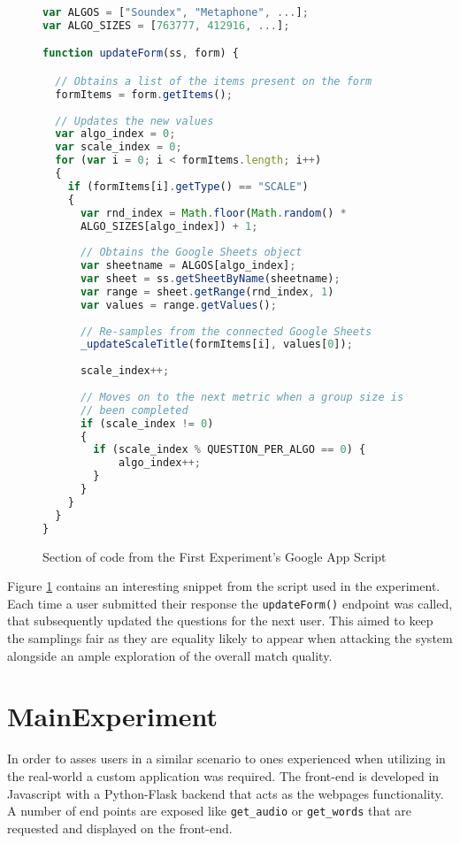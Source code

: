 \begin{figure}[!h]
\begin{lstlisting}[frame=single, language=Javascript]
var ALGOS = ["Soundex", "Metaphone", ...];
var ALGO_SIZES = [763777, 412916, ...];

function updateForm(ss, form) {

  // Obtains a list of the items present on the form
  formItems = form.getItems();
  
  // Updates the new values
  var algo_index = 0;
  var scale_index = 0;
  for (var i = 0; i < formItems.length; i++)
  {
    if (formItems[i].getType() == "SCALE")
    {
      var rnd_index = Math.floor(Math.random() * 
      ALGO_SIZES[algo_index]) + 1;    
      
      // Obtains the Google Sheets object
      var sheetname = ALGOS[algo_index];
      var sheet = ss.getSheetByName(sheetname);
      var range = sheet.getRange(rnd_index, 1)
      var values = range.getValues();
           
      // Re-samples from the connected Google Sheets
      _updateScaleTitle(formItems[i], values[0]);
      
      scale_index++;
      
      // Moves on to the next metric when a group size is
      // been completed
      if (scale_index != 0)
      {
        if (scale_index % QUESTION_PER_ALGO == 0) {
            algo_index++;
        }
      }
    }
  }
}
\end{lstlisting}
\caption{Section of code from the First Experiment's Google App Script}
\label{fig:GoogleAppScript}
\end{figure}

Figure \ref{fig:GoogleAppScript} contains an interesting snippet from the script used in the experiment. Each time a user submitted their response the \verb|updateForm()| endpoint was called, that subsequently updated the questions for the next user. This aimed to keep the samplings fair as they are equality likely to appear when attacking the system alongside an ample exploration of the overall match quality.

\section{MainExperiment}
In order to asses users in a similar scenario to ones experienced when utilizing \pep in the real-world a custom application was required. The front-end is developed in Javascript with a Python-Flask backend that acts as the webpages functionality. A number of end points are exposed like \verb|get_audio| or \verb|get_words| that are requested and displayed on the front-end.

